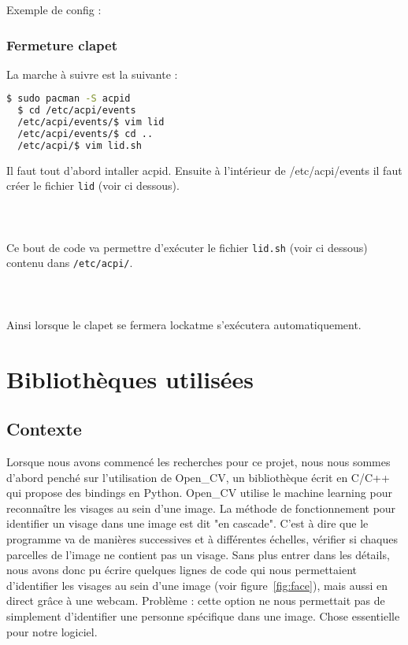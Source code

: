 Exemple de config :

\subsubsection{Fermeture clapet}
La marche à suivre est la suivante :
\begin{lstlisting}[language=bash]
  $ sudo pacman -S acpid
  $ cd /etc/acpi/events
  /etc/acpi/events/$ vim lid
  /etc/acpi/events/$ cd ..
  /etc/acpi/$ vim lid.sh
\end{lstlisting}
Il faut tout d'abord intaller acpid. Ensuite à
l'intérieur de /etc/acpi/events il faut créer le
fichier \verb|lid| (voir ci dessous).\\
\\
\\
\\
Ce bout de code va permettre d'exécuter le fichier \verb|lid.sh| (voir ci dessous)
contenu dans \verb|/etc/acpi/|.\\
\\
\\
\\
Ainsi lorsque le clapet se fermera lockatme s'exécutera automatiquement.

\newpage

\section{Bibliothèques utilisées}
\subsection{Contexte}
Lorsque nous avons commencé les recherches pour ce projet, nous nous sommes
d'abord penché sur l'utilisation de Open\_CV, un bibliothèque écrit en C/C++ qui
propose des bindings en Python. Open\_CV utilise le machine learning pour
reconnaître les visages au sein d'une image. La méthode de fonctionnement pour
identifier un visage dans une image est dit "en cascade". C'est à dire que le
programme va de manières successives et à différentes échelles, vérifier si
chaques parcelles de l'image ne contient pas un visage. Sans plus entrer dans
les détails, nous avons donc pu écrire quelques lignes de code qui nous
permettaient d'identifier les visages au sein d'une image (voir
figure~\ref{fig:face}), mais aussi en direct grâce à une webcam. Problème :
cette option ne nous permettait pas de simplement d'identifier une personne
spécifique dans une image. Chose essentielle pour notre logiciel.
\\

